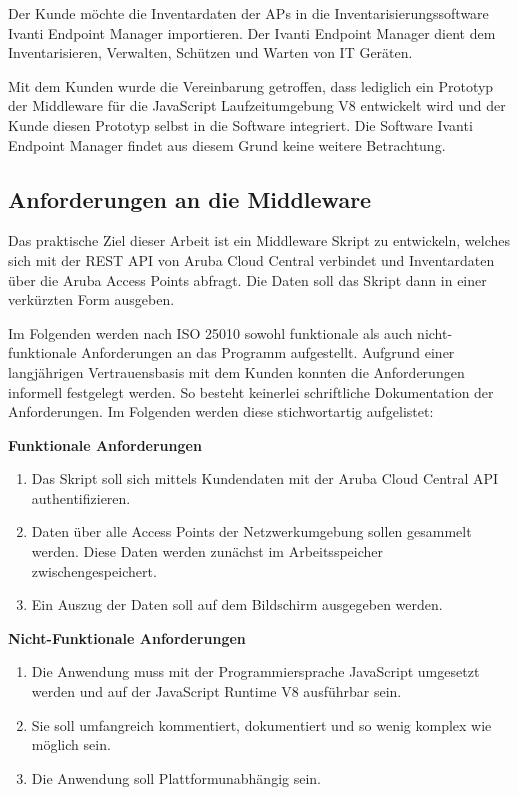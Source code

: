 Der Kunde möchte die Inventardaten der APs in die Inventarisierungssoftware Ivanti Endpoint Manager importieren. Der Ivanti Endpoint Manager dient dem Inventarisieren, Verwalten, Schützen und Warten von IT Geräten. 

Mit dem Kunden wurde die Vereinbarung getroffen, dass lediglich ein Prototyp der Middleware für die JavaScript Laufzeitumgebung V8 entwickelt wird und der Kunde diesen Prototyp selbst in die Software integriert. Die Software Ivanti Endpoint Manager findet aus diesem Grund keine weitere Betrachtung.

\subsection{Anforderungen an die Middleware}\label{subsection:anforderungen-an-die-middleware}

Das praktische Ziel dieser Arbeit ist ein Middleware Skript zu entwickeln, welches sich mit der REST API von Aruba Cloud Central verbindet und Inventardaten über die Aruba Access Points abfragt. Die Daten soll das Skript dann in einer verkürzten Form ausgeben.

Im Folgenden werden nach ISO 25010 sowohl funktionale als auch nicht-funktionale Anforderungen an das Programm aufgestellt. Aufgrund einer langjährigen Vertrauensbasis mit dem Kunden konnten die Anforderungen informell festgelegt werden. So besteht keinerlei schriftliche Dokumentation der Anforderungen. Im Folgenden werden diese stichwortartig aufgelistet:

\textbf{Funktionale Anforderungen}

\begin{enumerate}
    \item Das Skript soll sich mittels Kundendaten mit der Aruba Cloud Central API authentifizieren.
    \item Daten über alle Access Points der Netzwerkumgebung sollen gesammelt werden. Diese Daten werden zunächst im Arbeitsspeicher zwischengespeichert.
    \item Ein Auszug der Daten soll auf dem Bildschirm ausgegeben werden. 
\end{enumerate}

\textbf{Nicht-Funktionale Anforderungen}

\begin{enumerate}
    \item Die Anwendung muss mit der Programmiersprache JavaScript umgesetzt werden und auf der JavaScript Runtime V8 ausführbar sein.
    \item Sie soll umfangreich kommentiert, dokumentiert und so wenig komplex wie möglich sein.
    \item Die Anwendung soll Plattformunabhängig sein.
    
\end{enumerate}

